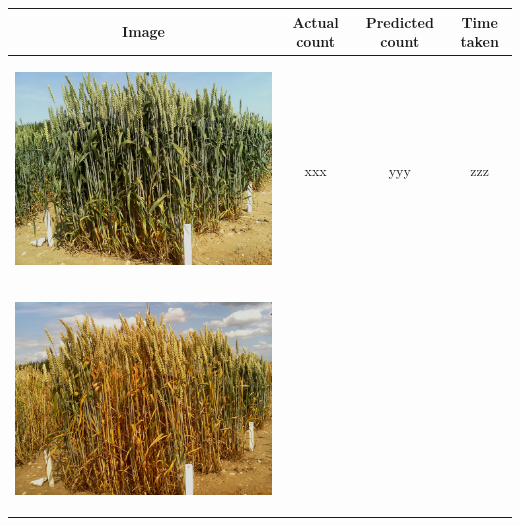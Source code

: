 \begin{table}[ht!]
  \centering
  \begin{tabular}{ | c | c | c | c |}
    \hline
    Image & Actual count & Predicted count & Time taken \\ \hline
    \begin{minipage}{.3\textwidth}
      \begin{center}
		\includegraphics[width=\linewidth]{Images/008}
      \end{center}
    \end{minipage}
    &
      xxx
    & 
      yyy
    & 
      zzz
    \\ \hline
    \begin{minipage}{.3\textwidth}
      \begin{center}
		\includegraphics[width=\linewidth]{Images/009}

\end{center}
\end{minipage}
\end{tabular}
\end{table}
